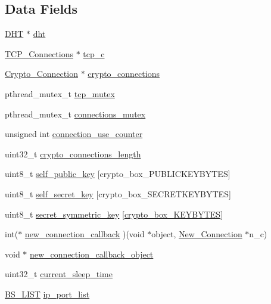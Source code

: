 \subsection*{Data Fields}
\begin{DoxyCompactItemize}
\item 
\hyperlink{struct_d_h_t}{D\+H\+T} $\ast$ \hyperlink{struct_net___crypto_a8b3d6ce8745acc52695e252bdb1531b6}{dht}
\item 
\hyperlink{struct_t_c_p___connections}{T\+C\+P\+\_\+\+Connections} $\ast$ \hyperlink{struct_net___crypto_a179982a02be89eaf6617ed81bd3c0961}{tcp\+\_\+c}
\item 
\hyperlink{struct_crypto___connection}{Crypto\+\_\+\+Connection} $\ast$ \hyperlink{struct_net___crypto_a13fdc865b8a114466ba136f5390ec1b2}{crypto\+\_\+connections}
\item 
pthread\+\_\+mutex\+\_\+t \hyperlink{struct_net___crypto_a2e8f7f4dff2f2fc4ac2cc32b0c886974}{tcp\+\_\+mutex}
\item 
pthread\+\_\+mutex\+\_\+t \hyperlink{struct_net___crypto_a213135bf3b5b80b1cfe99b27dc42815e}{connections\+\_\+mutex}
\item 
unsigned int \hyperlink{struct_net___crypto_ab5be057850e1cee67902276a69900326}{connection\+\_\+use\+\_\+counter}
\item 
uint32\+\_\+t \hyperlink{struct_net___crypto_a9c91c3c65885a2bd39d0f864b9a5ddb9}{crypto\+\_\+connections\+\_\+length}
\item 
uint8\+\_\+t \hyperlink{struct_net___crypto_ae726df8bdc26380e5a6c3187a00d6881}{self\+\_\+public\+\_\+key} \mbox{[}crypto\+\_\+box\+\_\+\+P\+U\+B\+L\+I\+C\+K\+E\+Y\+B\+Y\+T\+E\+S\mbox{]}
\item 
uint8\+\_\+t \hyperlink{struct_net___crypto_aa05050f86513ff53fe9da81f73c72267}{self\+\_\+secret\+\_\+key} \mbox{[}crypto\+\_\+box\+\_\+\+S\+E\+C\+R\+E\+T\+K\+E\+Y\+B\+Y\+T\+E\+S\mbox{]}
\item 
uint8\+\_\+t \hyperlink{struct_net___crypto_ab9f2ff47bc0b1e5110202a6e4be86390}{secret\+\_\+symmetric\+\_\+key} \mbox{[}\hyperlink{crypto__core_8h_aade7cd33abc5668970c55ed009ab00c8}{crypto\+\_\+box\+\_\+\+K\+E\+Y\+B\+Y\+T\+E\+S}\mbox{]}
\item 
int($\ast$ \hyperlink{struct_net___crypto_a4e2c131b4a4b4ccb2acc140c29c628be}{new\+\_\+connection\+\_\+callback} )(void $\ast$object, \hyperlink{struct_new___connection}{New\+\_\+\+Connection} $\ast$n\+\_\+c)
\item 
void $\ast$ \hyperlink{struct_net___crypto_af28bac95ede5cab8426b07e02dd1a1b0}{new\+\_\+connection\+\_\+callback\+\_\+object}
\item 
uint32\+\_\+t \hyperlink{struct_net___crypto_a86823a02e323235811eada4755e3f81e}{current\+\_\+sleep\+\_\+time}
\item 
\hyperlink{struct_b_s___l_i_s_t}{B\+S\+\_\+\+L\+I\+S\+T} \hyperlink{struct_net___crypto_ae8cfe94df9c9030bbc525010603450ac}{ip\+\_\+port\+\_\+list}
\end{DoxyCompactItemize}


